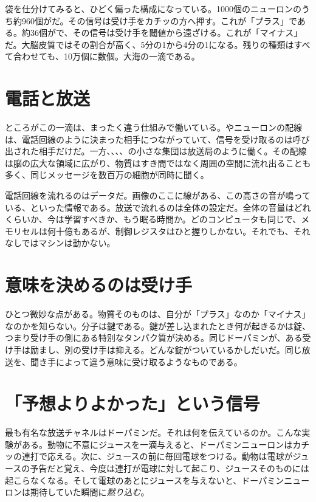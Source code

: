 袋を仕分けてみると、ひどく偏った構成になっている。1000個のニューロンのうち約960個がだ。その信号は受け手をカチッの方へ押す。これが「プラス」である。約36個がで、その信号は受け手を閾値から遠ざける。これが「マイナス」だ。大脳皮質ではその割合が高く、5分の1から4分の1になる。残りの種類はすべて合わせても、10万個に数個。大海の一滴である。

\section*{電話と放送}

ところがこの一滴は、まったく違う仕組みで働いている。やニューロンの配線は、電話回線のように決まった相手につながっていて、信号を受け取るのは呼び出された相手だけだ。一方、、、、の小さな集団は放送局のように働く。その配線は脳の広大な領域に広がり、物質はすき間ではなく周囲の空間に流れ出ることも多く、同じメッセージを数百万の細胞が同時に聞く。

電話回線を流れるのはデータだ。画像のここに線がある、この高さの音が鳴っている、といった情報である。放送で流れるのは全体の設定だ。全体の音量はどれくらいか、今は学習すべきか、もう眠る時間か。どのコンピュータも同じで、メモリセルは何十億もあるが、制御レジスタはひと握りしかない。それでも、それなしではマシンは動かない。

\section*{意味を決めるのは受け手}

ひとつ微妙な点がある。物質そのものは、自分が「プラス」なのか「マイナス」なのかを知らない。分子は鍵である。鍵が差し込まれたとき何が起きるかは錠、つまり受け手の側にある特別なタンパク質が決める。同じドーパミンが、ある受け手は励まし、別の受け手は抑える。どんな錠がついているかしだいだ。同じ放送を、聞き手によって違う意味に受け取るようなものである。

\section*{「予想よりよかった」という信号}

最も有名な放送チャネルはドーパミンだ。それは何を伝えているのか。こんな実験がある。動物に不意にジュースを一滴与えると、ドーパミンニューロンはカチッの連打で応える。次に、ジュースの前に毎回電球をつける。動物は電球がジュースの予告だと覚え、今度は連打が電球に対して起こり、ジュースそのものには起こらなくなる。そして電球のあとにジュースを与えないと、ドーパミンニューロンは期待していた瞬間に\emph{黙り込む}。

